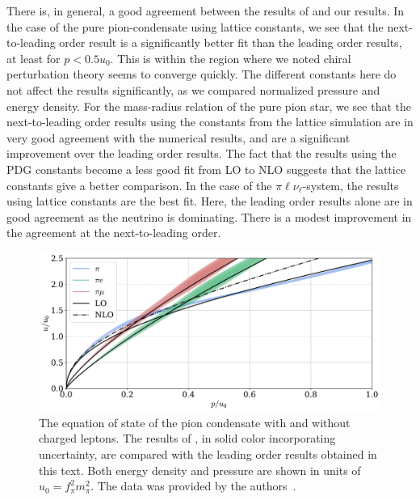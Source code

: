 There is, in general, a good agreement between the results of \citeauthor{brandtNewClassCompact2018} and our results.
In the case of the pure pion-condensate using lattice constants, we see that the next-to-leading order result is a significantly better fit than the leading order results, at least for $p<0.5 u_0$.
This is within the region where we noted chiral perturbation theory seems to converge quickly.
The different constants here do not affect the results significantly, as we compared normalized pressure and energy density.
For the mass-radius relation of the pure pion star, we see that the next-to-leading order results using the constants from the lattice simulation are in very good agreement with the numerical results, and are a significant improvement over the leading order results.
The fact that the results using the PDG constants become a less good fit from LO to NLO suggests that the lattice constants give a better comparison.
In the case of the $\pi\ell\nu_\ell$-system, the results using lattice constants are the best fit.
Here, the leading order results alone are in good agreement as the neutrino is dominating.
There is a modest improvement in the agreement at the next-to-leading order.



\begin{figure}[H]
    \centering
    \includegraphics[width=.85\textwidth]{../scripts/figurer/brandt_eos.pdf}
    \caption{
        The equation of state of the pion condensate with and without charged leptons.
        The results of \citeauthor{brandtNewClassCompact2018}, in solid color incorporating uncertainty, are compared with the leading order results obtained in this text.
        Both energy density and pressure are shown in units of $u_0 = f_\pi^2 m_\pi^2$.
        The data was provided by the authors~\autocite{brandtNewClassCompact2018}.
    }
    \label{fig: brandt eos}
\end{figure}

